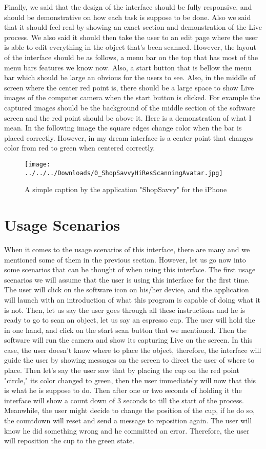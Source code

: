 \documentclass[12pt, oneside]{amsart}   	%
\begin{document}
Finally, we said that the design of the interface should be fully responsive, and should be demonstrative on how each task is suppose to be done.  Also we said that it should feel real by showing an exact section and demonstration of the Live process.  We also said it should then take the user to an edit page where the user is able to edit everything in the object that's been scanned.  However, the layout of the interface should be as follows, a menu bar on the top that has most of the menu bars features we know now.  Also, a start button that is bellow the menu bar which should be large an obvious for the users to see.  Also, in the middle of screen where the center red point is, there should be a large space to show Live images of the computer camera when the start button is clicked.  For example the captured images should be the background of the middle section of the software screen and the red point should be above it.  Here is a demonstration of what I mean. In the following image the square edges change color when the bar is placed correctly. However, in my dream interface is a center point that changes color from red to green when centered correctly.

\begin{figure}[!h]
\centering
\texttt{[image: ../../../Downloads/0\_ShopSavvyHiResScanningAvatar.jpg]}
\caption{A simple caption by the application "ShopSavvy" for the iPhone}
\label{overflow}
\end{figure}

 \section{Usage Scenarios}
When it comes to the usage scenarios of this interface, there are many and we mentioned some of them in the previous section.  However, let us go now into some scenarios that can be thought of when using this interface.  The first usage scenarios we will assume that the user is using this interface for the first time.  The user will click on the software icon on his/her device, and the application will launch with an introduction of what this program is capable of doing what it is not.  Then, let us say the user goes through all these instructions and he is ready to go to scan an object, let us say an espresso cup.  The user will hold the in one hand, and click on the start scan button that we mentioned.  Then the software will run the camera and show its capturing Live on the screen.  In this case, the user doesn't know where to place the object, therefore, the interface will guide the user by showing messages on the screen to direct the user of where to place. Then let's say the user saw that by placing the cup on the red point "circle," its color changed to green, then the user immediately will now that this is what he is suppose to do.  Then after one or two seconds of holding it the interface will show a count down of 3 seconds to till the start of the process. Meanwhile, the user might decide to change the position of the cup, if he do so, the countdown will reset and send a message to reposition again. The user will know he did something wrong and he committed an error. Therefore, the user will reposition the cup to the green state. 
\end{document}
